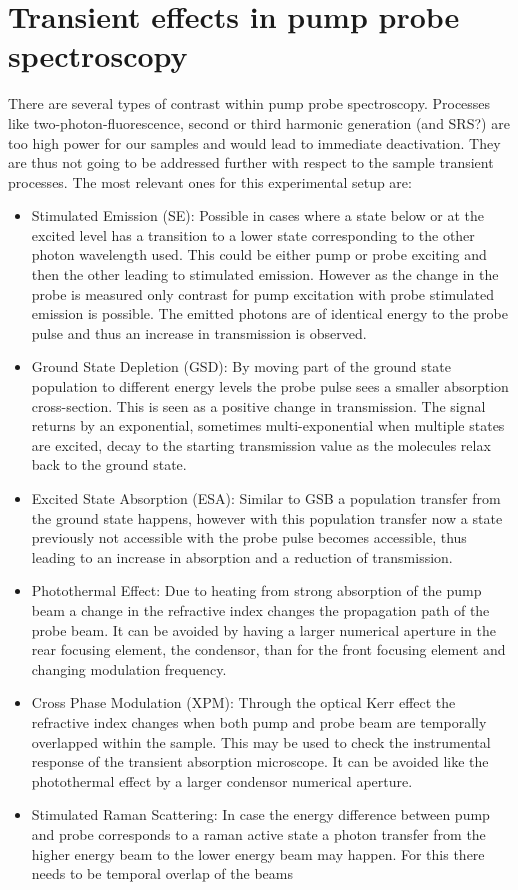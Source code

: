 \documentclass[twoside,openright]{scrreprt}
\begin{document}
\section{Transient effects in pump probe spectroscopy}
There are several types of contrast within pump probe spectroscopy. Processes like two-photon-fluorescence, second or third harmonic generation (and SRS?) are too high power for our samples and would lead to immediate deactivation. They are thus not going to be addressed further with respect to the sample transient processes. The most relevant ones for this experimental setup are:\cite{10.1063/1.5129123}
\begin{itemize}
\item Stimulated Emission (SE): Possible in cases where a state below or at the  excited level has a transition to a lower state corresponding to the other photon wavelength used. This could be either pump or probe exciting and then the other leading to stimulated emission. However as the change in the probe is measured only contrast for pump excitation with probe stimulated emission is possible. The emitted photons are of identical energy to the probe pulse and thus an increase in transmission is observed.
\item Ground State Depletion (GSD): By moving part of the ground state population to different energy levels the probe pulse sees a smaller absorption cross-section. This is seen as a positive change in transmission. The signal returns by an exponential, sometimes multi-exponential when multiple states are excited, decay to the starting transmission value as the molecules relax back to the ground state.
\item Excited State Absorption (ESA): Similar to GSB a population transfer from the ground state happens, however with this population transfer now a state previously not accessible with the probe pulse becomes accessible, thus leading to an increase in absorption and a reduction of transmission.
\item Photothermal Effect: Due to heating from strong absorption of the pump beam a change in the refractive index changes the propagation path of the probe beam. It can be avoided by having a larger numerical aperture in the rear focusing element, the condensor, than for the front focusing element and changing modulation frequency.
\item Cross Phase Modulation (XPM): Through the optical Kerr effect the refractive index changes when both pump and probe beam are temporally overlapped within the sample. This may be used to check the instrumental response of the transient absorption microscope. It can be avoided like the photothermal effect by a larger condensor numerical aperture.
\item Stimulated Raman Scattering: In case the energy difference between pump and probe corresponds to a raman active state a photon transfer from the higher energy beam to the lower energy beam may happen. For this there needs to be temporal overlap of the beams
\end{itemize}
\end{document}
